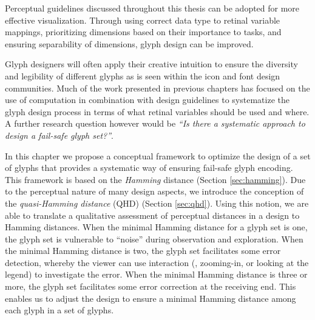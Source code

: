 Perceptual guidelines discussed throughout this thesis can be adopted for more effective visualization. 
Through using correct data type to retinal variable mappings, prioritizing dimensions based on their importance to tasks, and ensuring separability of dimensions, glyph design can be improved.


Glyph designers will often apply their creative intuition to ensure the diversity and legibility of different glyphs as is seen within the icon and font design communities.
Much of the work presented in previous chapters has focused on the use of computation in combination with design guidelines to systematize the glyph design process in terms of what retinal variables should be used and where. 
A further research question however would be \emph{``Is there a systematic approach to design a fail-safe glyph set?''}.

In this chapter we propose a conceptual framework to optimize the design of a set of glyphs that provides a systematic way of ensuring fail-safe glyph encoding.
This framework is based on the \emph{Hamming} distance (Section \ref{sec:hamming}).
Due to the perceptual nature of many design aspects, we introduce the conception of the \emph{quasi-Hamming distance} (QHD) (Section \ref{sec:qhd}).
Using this notion, we are able to translate a qualitative assessment of perceptual distances in a design to Hamming distances.
When the minimal Hamming distance for a glyph set is one, the glyph set is vulnerable to ``noise'' during observation and exploration. 
When the minimal Hamming distance is two, the glyph set facilitates some error detection, whereby the viewer can use interaction (\eg, zooming-in, or looking at the legend) to investigate the error.
When the minimal Hamming distance is three or more, the glyph set facilitates some error correction at the receiving end.
This enables us to adjust the design to ensure a minimal Hamming distance among each glyph in a set of glyphs.


